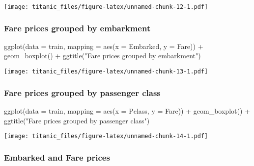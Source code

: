 \documentclass[
]{article}
\newenvironment{Shaded}{\begin{snugshade}}{\end{snugshade}}
\newcommand{\AttributeTok}[1]{\textcolor[rgb]{0.77,0.63,0.00}{#1}}
\newcommand{\FunctionTok}[1]{\textcolor[rgb]{0.00,0.00,0.00}{#1}}
\newcommand{\NormalTok}[1]{#1}
\newcommand{\SpecialCharTok}[1]{\textcolor[rgb]{0.00,0.00,0.00}{#1}}
\newcommand{\StringTok}[1]{\textcolor[rgb]{0.31,0.60,0.02}{#1}}
\begin{document}
\texttt{[image: titanic\_files/figure-latex/unnamed-chunk-12-1.pdf]}

\hypertarget{fare-prices-grouped-by-embarkment}{%
\subsubsection{Fare prices grouped by
embarkment}\label{fare-prices-grouped-by-embarkment}}

\begin{Shaded}
\begin{Highlighting}[]
\FunctionTok{ggplot}\NormalTok{(}\AttributeTok{data =}\NormalTok{ train, }\AttributeTok{mapping =} \FunctionTok{aes}\NormalTok{(}\AttributeTok{x =}\NormalTok{ Embarked, }\AttributeTok{y =}\NormalTok{ Fare)) }\SpecialCharTok{+}
  \FunctionTok{geom\_boxplot}\NormalTok{() }\SpecialCharTok{+}
  \FunctionTok{ggtitle}\NormalTok{(}\StringTok{"Fare prices grouped by embarkment"}\NormalTok{)}
\end{Highlighting}
\end{Shaded}

\texttt{[image: titanic\_files/figure-latex/unnamed-chunk-13-1.pdf]}

\hypertarget{fare-prices-grouped-by-passenger-class}{%
\subsubsection{Fare prices grouped by passenger
class}\label{fare-prices-grouped-by-passenger-class}}

\begin{Shaded}
\begin{Highlighting}[]
\FunctionTok{ggplot}\NormalTok{(}\AttributeTok{data =}\NormalTok{ train, }\AttributeTok{mapping =} \FunctionTok{aes}\NormalTok{(}\AttributeTok{x =}\NormalTok{ Pclass, }\AttributeTok{y =}\NormalTok{ Fare)) }\SpecialCharTok{+}
  \FunctionTok{geom\_boxplot}\NormalTok{() }\SpecialCharTok{+}
  \FunctionTok{ggtitle}\NormalTok{(}\StringTok{"Fare prices grouped by passenger class"}\NormalTok{)}
\end{Highlighting}
\end{Shaded}

\texttt{[image: titanic\_files/figure-latex/unnamed-chunk-14-1.pdf]}

\hypertarget{embarked-and-fare-prices}{%
\subsubsection{Embarked and Fare
prices}\label{embarked-and-fare-prices}}
\end{document}
